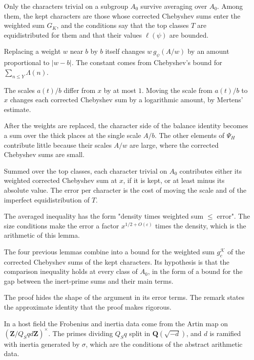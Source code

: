Only the characters trivial on a subgroup $A_0$ survive averaging over $A_0$.
Among them, the kept characters are those whose corrected Chebyshev sums enter the
weighted sum $G_K$, and the conditions say that the top classes $T$ are
equidistributed for them and that their values $\ell(\psi)$ are bounded.

Replacing a weight $w$ near $b$ by $b$ itself changes $w\,g_\psi(A/w)$ by an
amount proportional to $|w-b|$. The constant comes from Chebyshev's bound for
$\sum_{n\leq Y}\Lambda(n)$.

The scales $a(t)/b$ differ from $x$ by at most $1$. Moving the scale from
$a(t)/b$ to $x$ changes each corrected Chebyshev sum by a logarithmic amount, by Mertens'
estimate.

After the weights are replaced, the character side of the balance identity
becomes a sum over the thick places at the single scale $A/b$. The other
elements of $\Psi_H$ contribute little because their scales $A/w$ are large, where the
corrected Chebyshev sums are small.

Summed over the top classes, each character trivial on $A_0$ contributes
either its weighted corrected Chebyshev sum at $x$, if it is kept, or at least minus its
absolute value. The error per character is the cost of moving the scale and of
the imperfect equidistribution of $T$.

The averaged inequality has the form "density times weighted sum $\leq$ error".
The size conditions make the error a factor $x^{1/2+O(\varepsilon)}$ times the
density, which is the arithmetic of this lemma.

The four previous lemmas combine into a bound for the weighted sum
$g^{\mathcal K}_c$ of the corrected Chebyshev sums of the kept characters. Its
hypothesis is that the comparison inequality holds at
every class of $A_0$, in the form of a bound for the gap between the inert-prime
sums and their main terms.

The proof hides the shape of the argument in its error terms. The remark states
the approximate identity that the proof makes rigorous.

In a host field the Frobenius and inertia data come from the Artin map on
$(\mathbf Z/Q_Sqd\mathbf Z)^\times$. The primes dividing $Q_Sq$ split in
$\mathbf Q(\sqrt{-d})$, and $d$ is ramified with inertia generated by $\sigma$,
which are the conditions of the abstract arithmetic data.

